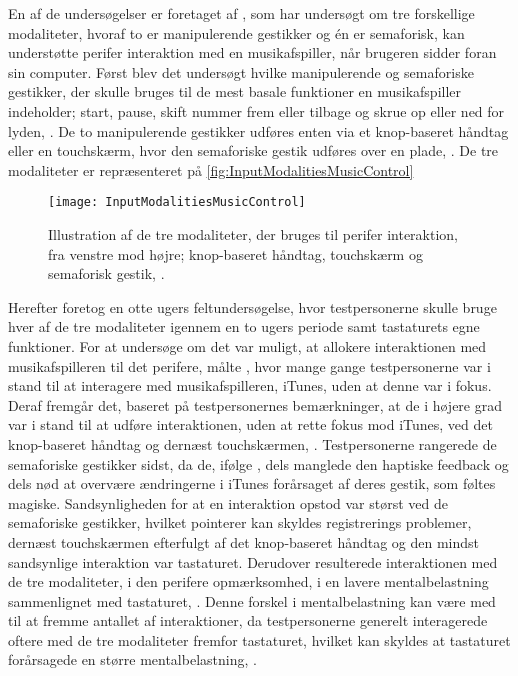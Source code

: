 En af de undersøgelser er foretaget af \textcite{PDF:ComparingInputModalities}, som har undersøgt om tre forskellige modaliteter, hvoraf to er manipulerende gestikker og én er semaforisk, kan understøtte perifer interaktion med en musikafspiller, når brugeren sidder foran sin computer. Først blev det undersøgt hvilke manipulerende og semaforiske gestikker, der skulle bruges til de mest basale funktioner en musikafspiller indeholder; start, pause, skift nummer frem eller tilbage og skrue op eller ned for lyden, \parencite[s. 165]{PDF:ComparingInputModalities}. De to manipulerende gestikker udføres enten via et knop-baseret håndtag eller en touchskærm, hvor den semaforiske gestik udføres over en plade, \parencite[s. 166]{PDF:ComparingInputModalities}. De tre modaliteter er repræsenteret på \autoref{fig:InputModalitiesMusicControl}
%
\begin{figure}[H]
	\centering
	\texttt{[image: InputModalitiesMusicControl]}
	\caption{Illustration af de tre modaliteter, der bruges til perifer interaktion, fra venstre mod højre; knop-baseret håndtag, touchskærm og semaforisk gestik, \parencite[s. 163]{PDF:ComparingInputModalities}.}
	\label{fig:InputModalitiesMusicControl}
\end{figure}
\noindent
%
Herefter foretog \textcite[ss. 169-174]{PDF:ComparingInputModalities} en otte ugers feltundersøgelse, hvor testpersonerne skulle bruge hver af de tre modaliteter igennem en to ugers periode samt tastaturets egne funktioner. For at undersøge om det var muligt, at allokere interaktionen med musikafspilleren til det perifere, målte \textcite[ss. 172-173]{PDF:ComparingInputModalities}, hvor mange gange testpersonerne var i stand til at interagere med musikafspilleren, iTunes, uden at denne var i fokus. Deraf fremgår det, baseret på testpersonernes bemærkninger, at de i højere grad var i stand til at udføre interaktionen, uden at rette fokus mod iTunes, ved det knop-baseret håndtag og dernæst touchskærmen, \parencite[ss. 172]{PDF:ComparingInputModalities}. Testpersonerne rangerede de semaforiske gestikker sidst, da de, ifølge \textcite[ss. 172-173]{PDF:ComparingInputModalities}, dels manglede den haptiske feedback og dels nød at overvære ændringerne i iTunes forårsaget af deres gestik, som føltes magiske. Sandsynligheden for at en interaktion opstod var størst ved de semaforiske gestikker, hvilket \textcite[s. 171]{PDF:ComparingInputModalities} pointerer kan skyldes registrerings problemer, dernæst touchskærmen efterfulgt af det knop-baseret håndtag og den mindst sandsynlige interaktion var tastaturet. Derudover resulterede interaktionen med de tre modaliteter, i den perifere opmærksomhed, i en lavere mentalbelastning sammenlignet med tastaturet, \parencite[s. 172]{PDF:ComparingInputModalities}. Denne forskel i mentalbelastning kan være med til at fremme antallet af interaktioner, da testpersonerne generelt interagerede oftere med de tre modaliteter fremfor tastaturet, hvilket kan skyldes at tastaturet forårsagede en større mentalbelastning, \parencite[ss. 174-175]{PDF:ComparingInputModalities}.    

